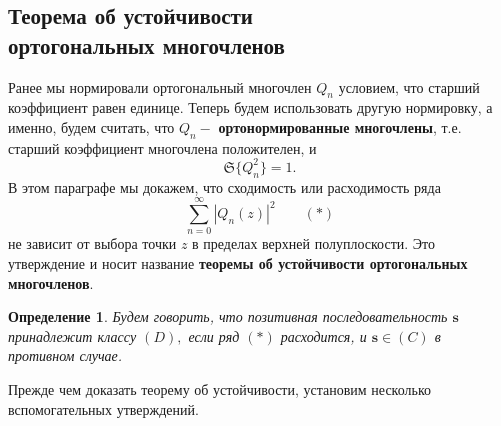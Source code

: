 \documentclass[12pt,a4paper]{article}
\theoremstyle{plain}   \newtheorem{Pro}{Задача}
\newtheorem{Def}{Определение}
\begin{document}
\subsection{Теорема об устойчивости \\
ортогональных многочленов}
$ \; $
\\
Ранее мы нормировали ортогональный многочлен
$ Q_n $
условием, что старший коэффициент равен единице.
Теперь будем использовать другую нормировку, а именно,
будем считать, что
$ Q_n - $
{\bfseries ортонормированные многочлены},
т.е. старший коэффициент многочлена положителен, и
$$
  \mathfrak{S} \{ Q_n ^2 \} =1.
$$
В этом параграфе мы докажем, что сходимость или расходимость ряда
$$
  \sum _{n=0}^{\infty}|Q_n (z)|^2
  \qquad ( \ast )
$$
не зависит от выбора точки
$ z $
в пределах верхней полуплоскости. Это утверждение и носит
название
{\bfseries теоремы об устойчивости ортогональных многочленов}.
\begin{Def}
Будем говорить, что позитивная последовательность
$ \mathbf{s} $
принадлежит классу
$ (D) , $
если ряд
$ (\ast ) $
расходится, и
$ \mathbf{s} \in (C) $
в противном случае.
\end{Def}
Прежде чем доказать теорему об устойчивости,
установим несколько вспомогательных утверждений.
\\
\end{document}

